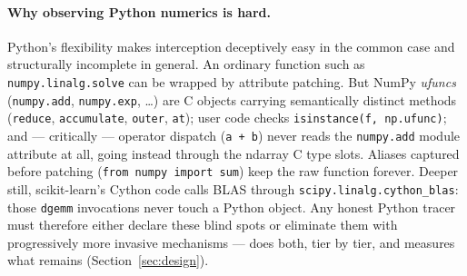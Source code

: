 \paragraph{Why observing Python numerics is hard.}
Python's flexibility makes interception deceptively easy in the common
case and structurally incomplete in general. An ordinary function such as
\texttt{numpy.linalg.solve} can be wrapped by attribute patching. But
NumPy \emph{ufuncs} (\texttt{numpy.add}, \texttt{numpy.exp}, \ldots) are C
objects carrying semantically distinct methods (\texttt{reduce},
\texttt{accumulate}, \texttt{outer}, \texttt{at}); user code checks
\texttt{isinstance(f, np.ufunc)}; and --- critically --- operator dispatch
(\texttt{a + b}) never reads the \texttt{numpy.add} module attribute at
all, going instead through the ndarray C type slots. Aliases captured
before patching (\texttt{from numpy import sum}) keep the raw function
forever. Deeper still, scikit-learn's Cython code calls BLAS through
\texttt{scipy.linalg.cython\_blas}: those \texttt{dgemm} invocations never
touch a Python object. Any honest Python tracer must therefore either
declare these blind spots or eliminate them with progressively more
invasive mechanisms --- \pyt{} does both, tier by tier, and measures what
remains (Section~\ref{sec:design}).
